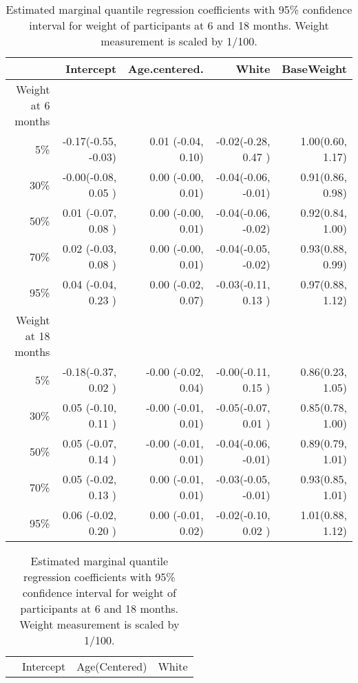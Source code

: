 \documentclass[12pt]{article}
\begin{document}
\begin{table}[ht]
  \renewcommand{\arraystretch}{1.3}
  \begin{center}
    \caption{Estimated marginal quantile regression coefficients with
      95\% confidence interval for weight of participants at 6 and 18
      months. Weight measurement is scaled by 1/100.}\label{tab:w2}
    \vspace{10pt}
    \begin{tabular}{rrrrr}
      \toprule
      & Intercept            & Age.centered.         & White               & BaseWeight       \\
      \hline
      Weight at 6 months                                                                                 \\
      5\%      & -0.17(-0.55, -0.03)  & 0.01  (-0.04, 0.10)   & -0.02(-0.28, 0.47 ) & 1.00(0.60, 1.17) \\
      30\%     & -0.00(-0.08, 0.05 )  & 0.00  (-0.00, 0.01)   & -0.04(-0.06, -0.01) & 0.91(0.86, 0.98) \\
      50\%     & 0.01 (-0.07, 0.08 )  & 0.00  (-0.00, 0.01)   & -0.04(-0.06, -0.02) & 0.92(0.84, 1.00) \\
      70\%     & 0.02 (-0.03, 0.08 )  & 0.00  (-0.00, 0.01)   & -0.04(-0.05, -0.02) & 0.93(0.88, 0.99) \\
      95\%     & 0.04 (-0.04, 0.23 )  & 0.00  (-0.02, 0.07)   & -0.03(-0.11, 0.13 ) & 0.97(0.88, 1.12) \\
      Weight at 18 months                                                                                \\
      5\%      & -0.18(-0.37, 0.02 )  & -0.00 (-0.02, 0.04)   & -0.00(-0.11, 0.15 ) & 0.86(0.23, 1.05) \\
      30\%     & 0.05 (-0.10, 0.11 )  & -0.00 (-0.01, 0.01)   & -0.05(-0.07, 0.01 ) & 0.85(0.78, 1.00) \\
      50\%     & 0.05 (-0.07, 0.14 )  & -0.00 (-0.01, 0.01)   & -0.04(-0.06, -0.01) & 0.89(0.79, 1.01) \\
      70\%     & 0.05 (-0.02, 0.13 )  & 0.00  (-0.01, 0.01)   & -0.03(-0.05, -0.01) & 0.93(0.85, 1.01) \\
      95\%     & 0.06 (-0.02, 0.20 )  & 0.00  (-0.01, 0.02)   & -0.02(-0.10, 0.02 ) & 1.01(0.88, 1.12) \\
      \bottomrule
    \end{tabular}
    \begin{tabular}{rrrr}
      \toprule
      & Intercept            & Age(Centered)         & White                                  \\

\end{tabular}
\end{center}
\end{table}
\end{document}
